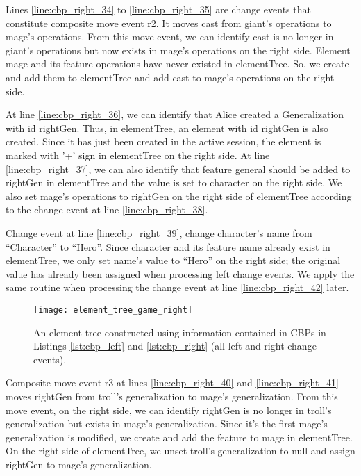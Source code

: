 Lines \ref{line:cbp_right_34} to \ref{line:cbp_right_35} are change events that constitute composite move event \textsf{r2}.  It  moves \textsf{cast} from \textsf{giant}'s \textsf{operations} to \textsf{mage}'s \textsf{operations}. From this move event, we can identify \textsf{cast} is no longer in  \textsf{giant}'s \textsf{operations} but now exists in \textsf{mage}'s \textsf{operations} on the right side. Element \textsf{mage} and its feature \textsf{operations} have never existed in \textsf{elementTree}. So, we create and add them to \textsf{elementTree} and add \textsf{cast} to \textsf{mage}'s \textsf{operations} on the right side.

At line \ref{line:cbp_right_36}, we can identify that Alice created a \textsf{Generalization} with id \textsf{rightGen}. Thus, in \textsf{elementTree}, an element with id \textsf{rightGen} is also created. Since it has just been created in the active session, the element is marked with '+' sign in \textsf{elementTree} on the right side. At line \ref{line:cbp_right_37}, we can also identify that feature \textsf{general} should be added to \textsf{rightGen} in \textsf{elementTree} and the value is set to \textsf{character} on the right side. We also set \textsf{mage}'s \textsf{operations} to \textsf{rightGen} on the right side of  \textsf{elementTree} according to the change event at line \ref{line:cbp_right_38}. 

Change event at line \ref{line:cbp_right_39}, change \textsf{character}'s \textsf{name} from ``Character'' to ``Hero''. Since \textsf{character} and its feature \textsf{name} already exist in \textsf{elementTree}, we only set \textsf{name}'s value to ``Hero'' on the right side; the original value has already been assigned when processing left change events. We apply the same routine when processing the change event at line \ref{line:cbp_right_42} later.

\begin{figure}[ht]
  \centering
  \texttt{[image: element\_tree\_game\_right]}
  \caption{An element tree constructed using information contained in CBPs in Listings \ref{lst:cbp_left} and \ref{lst:cbp_right} (all left and right change events).}
  \label{fig:right_element_tree_diagram}
\end{figure} 

Composite move event \textsf{r3} at lines \ref{line:cbp_right_40} and \ref{line:cbp_right_41} moves \textsf{rightGen} from \textsf{troll}'s \textsf{generalization} to \textsf{mage}'s \textsf{generalization}. From this move event, on the right side, we can identify \textsf{rightGen} is no longer in \textsf{troll}'s \textsf{generalization} but exists in \textsf{mage}'s \textsf{generalization}. Since it's the first \textsf{mage}'s \textsf{generalization} is modified, we create and add the feature to \textsf{mage} in \textsf{elementTree}. On the right side of \textsf{elementTree}, we unset \textsf{troll}'s \textsf{generalization} to null and assign \textsf{rightGen} to \textsf{mage}'s \textsf{generalization}.

